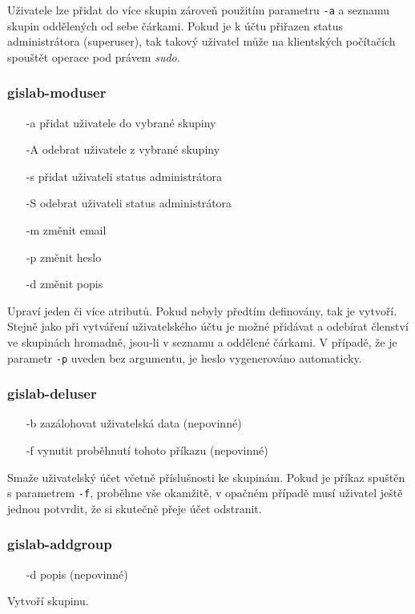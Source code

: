 Uživatele lze přidat do více skupin zároveň použitím parametru \texttt{-a} a seznamu skupin oddělených od sebe čárkami. Pokud je k účtu přiřazen status administrátora (superuser), tak takový uživatel může na klientských počítačích spouštět operace pod právem \textit{sudo}.

\subsubsection{gislab-moduser}
\begin{itemize}
\item [-a] přidat uživatele do vybrané skupiny
\item [-A] odebrat uživatele z vybrané skupiny
\item [-s] přidat uživateli status administrátora
\item [-S] odebrat uživateli status administrátora
\item [-m] změnit email
\item [-p] změnit heslo
\item [-d] změnit popis
\end{itemize}
Upraví jeden či více atributů. Pokud nebyly předtím definovány, tak je vytvoří. Stejně jako při vytváření uživatelského účtu je možné přidávat a odebírat členství ve skupinách hromadně, jsou-li v seznamu a oddělené čárkami. V případě, že je parametr \texttt{-p} uveden bez argumentu, je heslo vygenerováno automaticky.

\subsubsection{gislab-deluser}
\begin{itemize}
\item [-b] zazálohovat uživatelská data (nepovinné)
\item [-f] vynutit proběhnutí tohoto příkazu (nepovinné)
\end{itemize}
Smaže uživatelský účet včetně příslušnosti ke skupinám. Pokud je příkaz spuštěn s parametrem \texttt{-f}, proběhne vše okamžitě, v opačném případě musí uživatel ještě jednou potvrdit, že si skutečně přeje účet odstranit.

\subsubsection{gislab-addgroup}
\begin{itemize}
\item [-d] popis (nepovinné)
\end{itemize}
Vytvoří skupinu.

